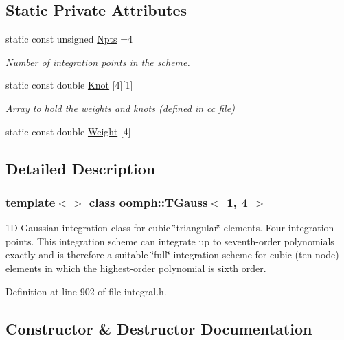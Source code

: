 \subsection*{Static Private Attributes}
\begin{DoxyCompactItemize}
\item 
static const unsigned \hyperlink{classoomph_1_1TGauss_3_011_00_014_01_4_a219e645b38a17ae8c5de31501d6b3eb7}{Npts} =4
\begin{DoxyCompactList}\small\item\em Number of integration points in the scheme. \end{DoxyCompactList}\item 
static const double \hyperlink{classoomph_1_1TGauss_3_011_00_014_01_4_a408d834ae1232bb1f25124a7109c209c}{Knot} \mbox{[}4\mbox{]}\mbox{[}1\mbox{]}
\begin{DoxyCompactList}\small\item\em Array to hold the weights and knots (defined in cc file) \end{DoxyCompactList}\item 
static const double \hyperlink{classoomph_1_1TGauss_3_011_00_014_01_4_a4d1975be33c55bf2450c540f9c4b50a9}{Weight} \mbox{[}4\mbox{]}
\end{DoxyCompactItemize}


\subsection{Detailed Description}
\subsubsection*{template$<$$>$\newline
class oomph\+::\+T\+Gauss$<$ 1, 4 $>$}

1D Gaussian integration class for cubic \char`\"{}triangular\char`\"{} elements. Four integration points. This integration scheme can integrate up to seventh-\/order polynomials exactly and is therefore a suitable \char`\"{}full\char`\"{} integration scheme for cubic (ten-\/node) elements in which the highest-\/order polynomial is sixth order. 

Definition at line 902 of file integral.\+h.



\subsection{Constructor \& Destructor Documentation}
\mbox{\label{classoomph_1_1TGauss_3_011_00_014_01_4_a4197838362780194f06ddc15e065c71e}} 
